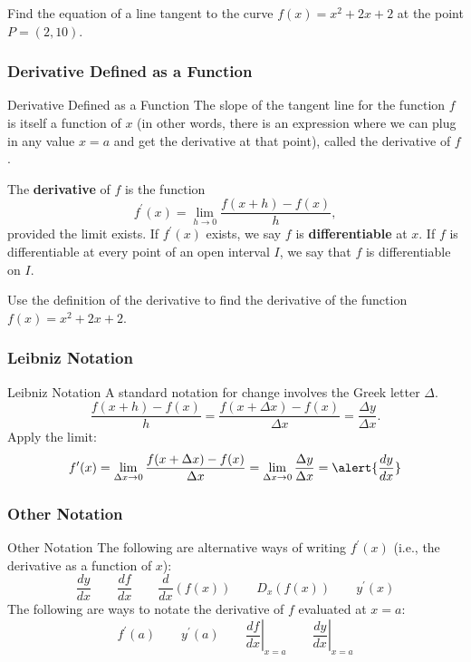 \documentclass[cal1spr16Lectures.tex]{subfiles}
\begin{document}
\begin{frame}
\begin{exe} Find the equation of a line tangent to the curve $f(x)=x^2+2x+2$ at the point $P=(2,10)$. \end{exe}
\end{frame}

\subsubsection{Derivative Defined as a Function}

\begin{frame}{\small Derivative Defined as a Function}\footnotesize
The slope of the tangent line for the function $f$ is itself a function of $x$ (in other words, there is an expression where we can plug in any value $x=a$ and get the derivative at that point), called the derivative of $f$.
\begin{dfn} The {\bf derivative} of $f$ is the function 
\[f^{\prime}(x)=\lim_{h \to 0} \frac{f(x+h)-f(x)}{h},\]
provided the limit exists.  If $f^{\prime}(x)$ exists, we say $f$ is {\bf differentiable} at $x$.  If $f$ is differentiable at every point of an open interval $I$, we say that $f$ is differentiable on $I$. \end{dfn}
\end{frame}

\begin{frame}
\begin{exe} Use the definition of the derivative to find the derivative of the function $f(x)=x^2+2x+2$. \end{exe}
\end{frame}

\subsubsection{Leibniz Notation}

\begin{frame}{\small Leibniz Notation}
A standard notation for change involves the Greek letter $\Delta$. 
\[\frac{f(x+h)-f(x)}{h}=\frac{f(x+\Delta x)-f(x)}{\Delta x}=\frac{\Delta y}{\Delta x}.\]
Apply the limit:
\[f^{\prime}(x)=\lim_{\Delta x \to 0} \frac{f(x+\Delta x)-f(x)}{\Delta x}=\lim_{\Delta x \to 0} \frac{\Delta y}{\Delta x}=\alert{\frac{dy}{dx}}\]
\end{frame}

\subsubsection{Other Notation}

\begin{frame}{\small Other Notation}
The following are alternative ways of writing $f^{\prime}(x)$ (i.e., the derivative as a function of $x$):
\[\frac{dy}{dx}\qquad\frac{df}{dx} \qquad\frac{d}{dx}\left(f(x)\right) \qquad D_x (f(x)) \qquad y^{\prime}(x)\]
The following are ways to notate the derivative of $f$ evaluated at $x=a$:
\[f^{\prime}(a)\qquad y^{\prime}(a) \qquad \left. \frac{df}{dx} \right|_{x=a} \qquad \left. \frac{dy}{dx} \right|_{x=a}\]
\end{frame}
\end{document}

